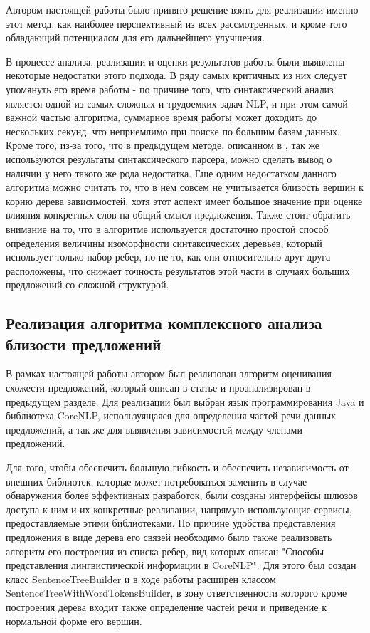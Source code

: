 Автором настоящей работы было принято решение взять для реализации именно этот метод,
как наиболее перспективный из всех рассмотренных, и кроме того обладающий
потенциалом для его дальнейшего улучшения.

В процессе анализа, реализации и оценки результатов работы были выявлены
некоторые недостатки этого подхода.
В ряду самых критичных из них следует упомянуть его время работы - 
по причине того, что синтаксический анализ является одной из самых
сложных и трудоемких задач NLP, и при этом самой важной частью алгоритма,
суммарное время работы может доходить до нескольких секунд,
что неприемлимо при поиске по большим базам данных.
Кроме того, из-за того, что в предыдущем методе, описанном в \cite{weightedDep},
так же используются результаты синтаксического парсера, можно сделать вывод
о наличии у него такого же рода недостатка.
Еще одним недостатком данного алгоритма можно считать то, что в нем совсем
не учитывается близость вершин к корню дерева зависимостей, хотя этот аспект
имеет большое значение при оценке влияния конкретных слов на общий смысл
предложения.
Также стоит обратить внимание на то, что в алгоритме
используется достаточно простой способ определения величины изоморфности
синтаксических деревьев, который использует только набор ребер, но не то,
как они относительно друг друга расположены, что снижает точность
результатов этой части в случаях больших предложений со сложной структурой.

\subsection{Реализация алгоритма комплексного анализа близости предложений}
В рамках настоящей работы автором был реализован алгоритм оценивания
схожести предложений, который описан в статье\cite{complexSim} и
проанализирован в предыдущем разделе.
Для реализации был выбран язык программирования Java и библиотека CoreNLP\cite{corenlp},
используящаяся для определения частей речи данных предложений, а так же для выявления зависимостей
между членами предложений.

Для того, чтобы обеспечить большую гибкость и обеспечить независимость от внешних библиотек,
которые может потребоваться заменить в случае обнаружения более эффективных разработок,
были созданы интерфейсы шлюзов доступа к ним и их конкретные реализации, напрямую
использующие сервисы, предоставляемые этими библиотеками.
По причине удобства представления предложения в виде дерева его связей
необходимо было также реализовать алгоритм его построения из списка ребер, 
вид которых описан "Способы представления лингвистической информации в CoreNLP".
Для этого был создан класс SentenceTreeBuilder и в ходе работы расширен
классом SentenceTreeWithWordTokensBuilder, в зону ответственности которого
кроме построения дерева входит также определение частей речи и приведение к нормальной форме
его вершин.

